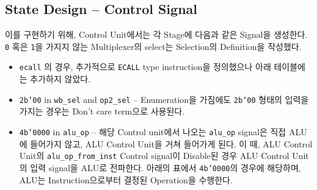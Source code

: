 \documentclass{scrartcl}
\begin{document}
\subsection{State Design -- Control Signal}
이를 구현하기 위해, Control Unit에서는 각 Stage에 다음과 같은 Signal을 생성한다. \texttt{0} 혹은 \texttt{1}을 가지지 않는
Multiplexer의 select는 Selection의 Definition을 작성했다.
\begin{itemize}
  \item \texttt{ecall} 의 경우, 추가적으로 \texttt{ECALL} type instruction을 정의했으나 아래 테이블에는 추가하지 않았다.
  \item \texttt{2b'00} in \texttt{wb\_sel} and \texttt{op2\_sel} -- Enumeration을 가짐에도 \texttt{2b'00} 형태의
  입력을 가지는 경우는 Don't care term으로 사용된다.
  \item \texttt{4b'0000} in \texttt{alu\_op} -- 해당 Control unit에서 나오는 \texttt{alu\_op} signal은 직접 ALU에 들어가지 않고,
  ALU Control Unit을 거쳐 들어가게 된다. 이 때, ALU Control Unit의 \texttt{alu\_op\_from\_inst} Control signal이 Disable된 경우
  ALU Control Unit의 입력 signal을 ALU로 전파한다. 아래의 표에서 \texttt{4b'0000}의 경우에 해당하며, ALU는 Instruction으로부터 결정된 Operation을 수행한다.
\end{itemize}
\end{document}
